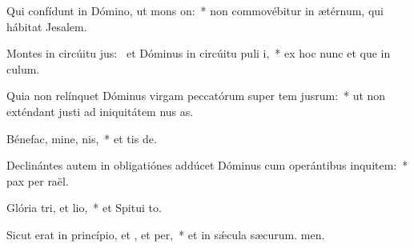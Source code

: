 \item Qui confídunt in Dómino, ut mons on:~* non commovébitur in ætérnum, qui hábitat  Jesalem.
\item Montes in circúitu jus:~\pscross{} et Dóminus in circúitu puli i,~* ex hoc nunc et que in culum.
\item Quia non relínquet Dóminus virgam peccatórum super tem jusrum:~* ut non exténdant justi ad iniquitátem nus as.
\item Bénefac, mine, nis,~* et tis de.
\item Declinántes autem in obligatiónes addúcet Dóminus cum operántibus inquitem:~* pax per raël.
\item Glória tri, et lio,~* et Spitui to.
\item Sicut erat in princípio, et , et per,~* et in sǽcula sæcurum. men.
